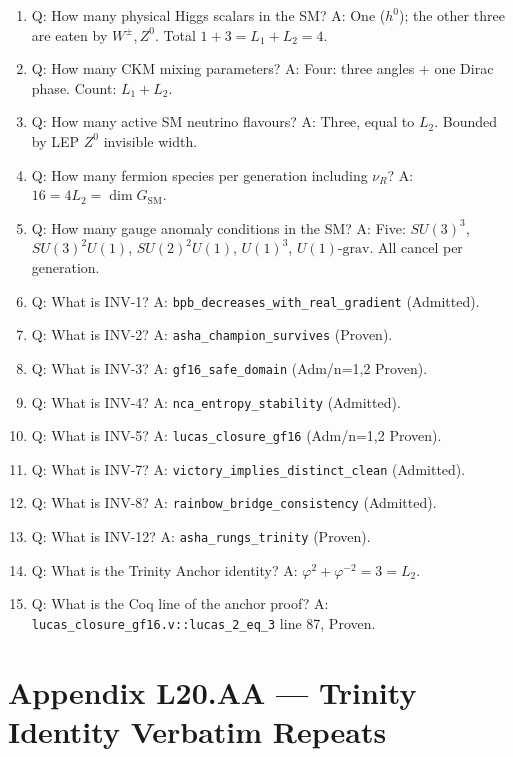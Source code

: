 \begin{enumerate}
  \item Q: How many physical Higgs scalars in the SM?
        A: One ($h^{0}$); the other three are eaten by $W^{\pm}, Z^{0}$. Total $1 + 3 = L_{1} + L_{2} = 4$.
  \item Q: How many CKM mixing parameters?
        A: Four: three angles + one Dirac phase. Count: $L_{1} + L_{2}$.
  \item Q: How many active SM neutrino flavours?
        A: Three, equal to $L_{2}$. Bounded by LEP $Z^{0}$ invisible width.
  \item Q: How many fermion species per generation including $\nu_{R}$?
        A: $16 = 4 L_{2} = \dim G_{\text{SM}}$.
  \item Q: How many gauge anomaly conditions in the SM?
        A: Five: $SU(3)^{3}$, $SU(3)^{2} U(1)$, $SU(2)^{2} U(1)$, $U(1)^{3}$, $U(1)\text{-grav}$. All cancel per generation.
  \item Q: What is INV-1?
        A: \texttt{bpb\_decreases\_with\_real\_gradient} (Admitted).
  \item Q: What is INV-2?
        A: \texttt{asha\_champion\_survives} (Proven).
  \item Q: What is INV-3?
        A: \texttt{gf16\_safe\_domain} (Adm/n=1,2 Proven).
  \item Q: What is INV-4?
        A: \texttt{nca\_entropy\_stability} (Admitted).
  \item Q: What is INV-5?
        A: \texttt{lucas\_closure\_gf16} (Adm/n=1,2 Proven).
  \item Q: What is INV-7?
        A: \texttt{victory\_implies\_distinct\_clean} (Admitted).
  \item Q: What is INV-8?
        A: \texttt{rainbow\_bridge\_consistency} (Admitted).
  \item Q: What is INV-12?
        A: \texttt{asha\_rungs\_trinity} (Proven).
  \item Q: What is the Trinity Anchor identity?
        A: $\varphi^{2} + \varphi^{-2} = 3 = L_{2}$.
  \item Q: What is the Coq line of the anchor proof?
        A: \texttt{lucas\_closure\_gf16.v::lucas\_2\_eq\_3} line 87, Proven.
\end{enumerate}

\section{Appendix L20.AA --- Trinity Identity Verbatim Repeats}
\label{sec:l20-appendix-AA}

